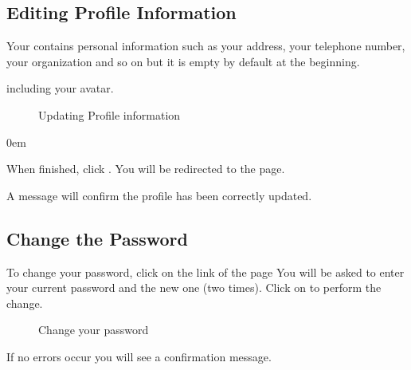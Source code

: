\documentclass[letterpaper,10pt,english]{sphinxmanual}
\begin{document}
\subsection{Editing Profile Information}
\label{\detokenize{01_welcome:editing-profile-information}}
\sphinxAtStartPar
Your  contains personal information such as your address, your telephone number, your organization and so on but it is empty by default at the beginning.
\begin{description}
\sphinxAtStartPar
including your avatar.

\end{description}

\begin{figure}[htbp]
\centering
\capstart

\noindent{}
\caption{Updating Profile information}\label{\detokenize{01_welcome:id8}}\end{figure}

\begin{DUlineblock}{0em}
\item[] When finished, click . You will be redirected to the  page.
\item[] A message will confirm the profile has been correctly updated.
\end{DUlineblock}


\subsection{Change the Password}
\label{\detokenize{01_welcome:change-the-password}}
\sphinxAtStartPar
To change your password, click on the  link of the  page
You will be asked to enter your current password and the new one (two times).
Click on  to perform the change.

\begin{figure}[htbp]
\centering
\capstart

\noindent{}
\caption{Change your password}\label{\detokenize{01_welcome:id9}}\end{figure}

\sphinxAtStartPar
If no errors occur you will see a confirmation message.
\end{document}
